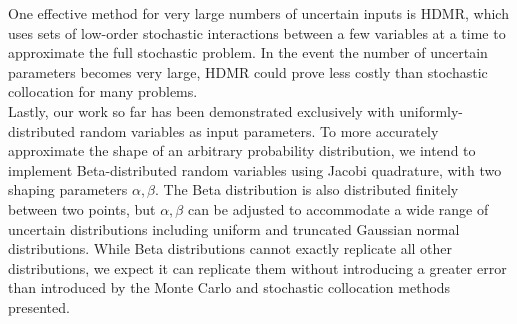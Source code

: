 \documentclass[11pt]{article}
\begin{document}
One effective method for very large numbers of uncertain inputs is HDMR, which uses sets of low-order stochastic interactions between a few variables at a time to approximate the full stochastic problem.  In the event the number of uncertain parameters becomes very large, HDMR could prove less costly than stochastic collocation for many problems. \\

Lastly, our work so far has been demonstrated exclusively with uniformly-distributed random variables as input parameters.  To more accurately approximate the shape of an arbitrary probability distribution, we intend to implement Beta-distributed random variables using Jacobi quadrature, with two shaping parameters $\alpha,\beta$.  The Beta distribution is also distributed finitely between two points, but $\alpha,\beta$ can be adjusted to accommodate a wide range of uncertain distributions including uniform and truncated Gaussian normal distributions.  While Beta distributions cannot exactly replicate all other distributions, we expect it can replicate them without introducing a greater error than introduced by the Monte Carlo and stochastic collocation methods presented.

\newpage
{}

\end{document}
